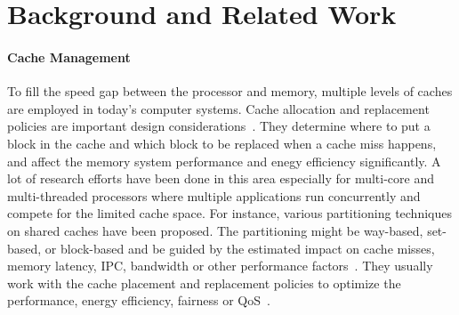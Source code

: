 \section{Background and Related Work}

\paragraph{Cache Management} 
To fill the speed gap between the processor
and memory, multiple levels of caches are employed in today's computer
systems.  Cache allocation and replacement policies are important
design considerations~\cite{Smith:CSUR-1982}. 
They determine where to put a block in the cache and 
which block to be replaced when a cache miss happens,
and affect the memory system performance and enegy efficiency
significantly. A lot of research efforts have been done in this
area especially for multi-core and multi-threaded
processors where multiple applications run concurrently and compete for
the limited cache space.  For instance, various partitioning techniques
on shared caches have been proposed. 
The partitioning might be way-based, set-based, or 
block-based and be guided by the estimated impact on cache 
misses, memory latency, IPC, bandwidth or other performance
factors~\cite{Albonesi:MICRO-1999, Suh:HPCA-2002,
Kim:PACT-2004, Suh:JSC-2004, Chandra:HPCA-2005, 
Chang:ISCA-2006, Varadarajan:MICRO-2006, Hsu:PACT-2006,
Qureshi:MICRO-2006, Lin:HPCA-2008, Awasthi:HPCA-2009, 
Xie:ISCA-2009, Kaseridis:ICPP-2009, Kaseridis:TC-2014,
Sanchez:ISCA-2011, Manikantan:ISCA-2012,
Cook:ISCA-2013, Khan:HPCA-2014, Ye:PACT-2014,
Brock:ICPP-2015, Gupta:ICPP-2015, Subramanian:MICRO-2015,
Selfa:PACT-2017, ElSayed:HPCA-2018, Xiao:ICPP-2019,
Chung:PACT-2019, Sun:IPDPS-2019, Pons:TPDS-2020, Park:TC-2020,
Kwon:MICRO-2023, Lee:MICRO-2025}.
They usually work with the cache placement and replacement policies to optimize
the performance, energy efficiency, fairness or QoS~\cite{Stone:TC-1992,
Sherwood:ICS-1999, Wang:PACT-2002, Takagi:ICS-2004,
Varadarajan:MICRO-2006, Keramidas:ICCD-2007, Qureshi:ISCA-2007,
Jaleel:PACT-2008, Kharbutli:TC-2008, Liu:MICRO-2008,
Jaleel:ISCA-2010, Sanchez:MICRO-2010, 
Wu:TACO-2011, Wu:MICRO-2011, Wu:MICRO-2011-2, Ebrahimi:ISCA-2011,
Duong:MICRO-2012, 
Tian:JMM-2014, Wang:MICRO-2014, Das:TACO-2015, Teran:MICRO-2016,
Beckmann:HPCA-2017, Jimenez:MICRO-2017, Kim:ASPLOS-2017, Jain:ISCA-2018, 
Shi:MICRO-2019, Zhang:ICPADS-2020, Sethumurugan:HPCA-2021,
Vittal:HPCA-2026}.

